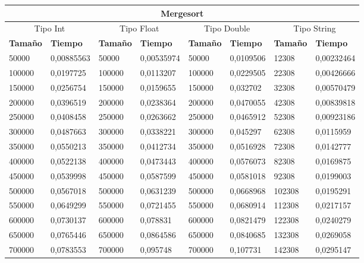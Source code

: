 \documentclass[11pt,openany]{book}
\begin{document}
\begin{table}[!ht]
    \centering
    \small
    \begin{tabular}{|l|l|l|l|l|l|l|l|}
    \hline
    \multicolumn{8}{|c|}{\cellcolor{blue!20}\textbf{Mergesort}} \\ \hline
    \multicolumn{2}{|c|}{\cellcolor{gray!20}Tipo Int} & \multicolumn{2}{c|}{\cellcolor{gray!20}Tipo Float} & \multicolumn{2}{c|}{\cellcolor{gray!20}Tipo Double} & \multicolumn{2}{c|}{\cellcolor{gray!20}Tipo String}\\ \hline
        \textbf{Tamaño} & \textbf{Tiempo} & \textbf{Tamaño} & \textbf{Tiempo} & \textbf{Tamaño} & \textbf{Tiempo} & \textbf{Tamaño} & \textbf{Tiempo} \\ \hline
        50000 & 0,00885563 & 50000 & 0,00535974 & 50000 & 0,0109506 & 12308 & 0,00232464 \\ \hline
        100000 & 0,0197725 & 100000 & 0,0113207 & 100000 & 0,0229505 & 22308 & 0,00426666 \\ \hline
        150000 & 0,0256754 & 150000 & 0,0159655 & 150000 & 0,032702 & 32308 & 0,00570479 \\ \hline
        200000 & 0,0396519 & 200000 & 0,0238364 & 200000 & 0,0470055 & 42308 & 0,00839818 \\ \hline
        250000 & 0,0408458 & 250000 & 0,0263662 & 250000 & 0,0465912 & 52308 & 0,00923186 \\ \hline
        300000 & 0,0487663 & 300000 & 0,0338221 & 300000 & 0,045297 & 62308 & 0,0115959 \\ \hline
        350000 & 0,0550213 & 350000 & 0,0412734 & 350000 & 0,0516928 & 72308 & 0,0142777 \\ \hline
        400000 & 0,0522138 & 400000 & 0,0473443 & 400000 & 0,0576073 & 82308 & 0,0169875 \\ \hline
        450000 & 0,0539998 & 450000 & 0,0587599 & 450000 & 0,0581018 & 92308 & 0,0199003 \\ \hline
        500000 & 0,0567018 & 500000 & 0,0631239 & 500000 & 0,0668968 & 102308 & 0,0195291 \\ \hline
        550000 & 0,0649299 & 550000 & 0,0721455 & 550000 & 0,0680914 & 112308 & 0,0217157 \\ \hline
        600000 & 0,0730137 & 600000 & 0,078831 & 600000 & 0,0821479 & 122308 & 0,0240279 \\ \hline
        650000 & 0,0765446 & 650000 & 0,0864586 & 650000 & 0,0840685 & 132308 & 0,0269058 \\ \hline
        700000 & 0,0783553 & 700000 & 0,095748 & 700000 & 0,107731 & 142308 & 0,0295147 \\ \hline

\end{tabular}
\end{table}
\end{document}
